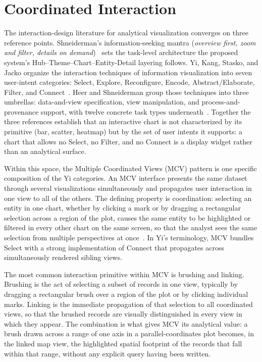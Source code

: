 \section{Coordinated Interaction}
\label{sec:foundations:mcv}

The interaction-design literature for analytical visualization
converges on three reference points. Shneiderman's information-seeking
mantra (\textit{overview first, zoom and filter, details on
demand})~\cite{shneiderman1996eyes} sets the task-level architecture
the proposed system's Hub--Theme--Chart--Entity-Detail layering
follows. Yi, Kang, Stasko, and Jacko organize the interaction techniques
of information visualization into seven user-intent categories: Select,
Explore, Reconfigure, Encode, Abstract/Elaborate, Filter, and
Connect~\cite{yi2007interaction}. Heer and Shneiderman group those
techniques into three umbrellas: data-and-view specification, view
manipulation, and process-and-provenance support, with twelve concrete
task types underneath~\cite{heer2012interactive}. Together the three
references establish that an interactive chart is not characterized by
its primitive (bar, scatter, heatmap) but by the set of user intents it
supports: a chart that allows no Select, no Filter, and no Connect is a
display widget rather than an analytical surface.

Within this space, the Multiple Coordinated Views (MCV) pattern is one
specific composition of the Yi categories. An MCV interface presents
the same dataset through several visualizations simultaneously and
propagates user interaction in one view to all of the others. The
defining property is coordination: selecting an entity in one chart,
whether by clicking a mark or by dragging a rectangular selection
across a region of the plot, causes the same entity to be highlighted
or filtered in every other chart on the same screen, so that the
analyst sees the same selection from multiple perspectives at
once~\cite{liu2022}. In Yi's terminology, MCV bundles Select with a
strong implementation of Connect that propagates across simultaneously
rendered sibling views.

The most common interaction primitive within MCV is brushing and
linking. Brushing is the act of selecting a subset of records in one
view, typically by dragging a rectangular brush over a region of the
plot or by clicking individual marks. Linking is the immediate
propagation of that selection to all coordinated views, so that the
brushed records are visually distinguished in every view in which they
appear. The combination is what gives MCV its analytical value: a
brush drawn across a range of one axis in a parallel-coordinates plot
becomes, in the linked map view, the highlighted spatial footprint of
the records that fall within that range, without any explicit query
having been written.

